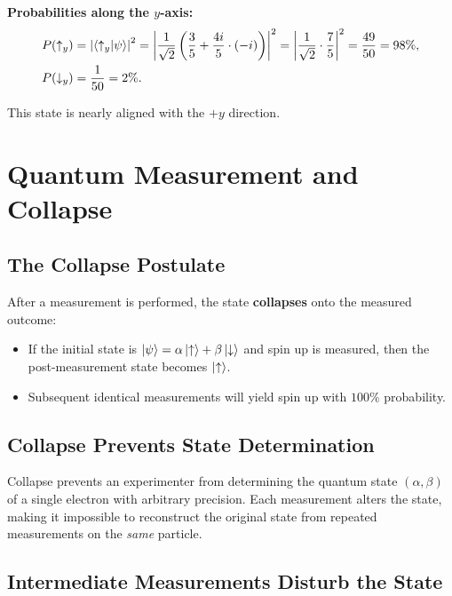 \documentclass[11pt,a4paper]{article}
\theoremstyle{definition}
\theoremstyle{plain}
\theoremstyle{remark}
\begin{document}
\textbf{Probabilities along the $y$-axis:}
\begin{align}
    P(\uparrow_y) &= \left|\braket{\uparrow_y}{\psi}\right|^2 = \left|\frac{1}{\sqrt{2}}\left(\frac{3}{5} + \frac{4i}{5}\cdot(-i)\right)\right|^2 = \left|\frac{1}{\sqrt{2}}\cdot\frac{7}{5}\right|^2 = \frac{49}{50} = 98\%, \\
    P(\downarrow_y) &= \frac{1}{50} = 2\%.
\end{align}

This state is nearly aligned with the $+y$ direction.

\section{Quantum Measurement and Collapse}

\subsection{The Collapse Postulate}

After a measurement is performed, the state \textbf{collapses} onto the measured outcome:

\begin{itemize}
    \item If the initial state is $\ket{\psi} = \alpha\ket{\uparrow} + \beta\ket{\downarrow}$ and spin up is measured, then the post-measurement state becomes $\ket{\uparrow}$.
    \item Subsequent identical measurements will yield spin up with $100\%$ probability.
\end{itemize}

\subsection{Collapse Prevents State Determination}

Collapse prevents an experimenter from determining the quantum state $(\alpha, \beta)$ of a single electron with arbitrary precision. Each measurement alters the state, making it impossible to reconstruct the original state from repeated measurements on the \emph{same} particle.

\subsection{Intermediate Measurements Disturb the State}
\end{document}

